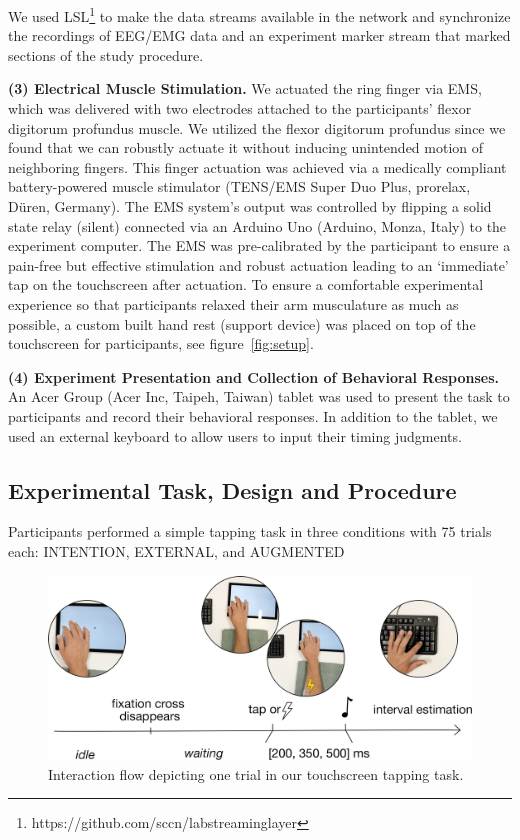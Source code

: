 We used LSL\footnote{https://github.com/sccn/labstreaminglayer} to make the data streams available in the network and synchronize the recordings of EEG/EMG data and an experiment marker stream that marked sections of the study procedure.

\indent\textbf{(3) Electrical Muscle Stimulation.} We actuated the ring finger via EMS, which was delivered with two electrodes attached to the participants' flexor digitorum profundus muscle. We utilized the flexor digitorum profundus since we found that we can robustly actuate it without inducing unintended motion of neighboring fingers. This finger actuation was achieved via a medically compliant battery-powered muscle stimulator (TENS/EMS Super Duo Plus, prorelax, Düren, Germany). The EMS system's output was controlled by flipping a solid state relay (silent) connected via an Arduino Uno (Arduino, Monza, Italy) to the experiment computer. The EMS was pre-calibrated by the participant to ensure a pain-free but effective stimulation and robust actuation leading to an `immediate' tap on the touchscreen after actuation. To ensure a comfortable experimental experience so that participants relaxed their arm musculature as much as possible, a custom built hand rest (support device) was placed on top of the touchscreen for participants, see figure~\ref{fig:setup}.

\indent\textbf{(4) Experiment Presentation and Collection of Behavioral Responses.} An Acer Group (Acer Inc, Taipeh, Taiwan) tablet was used to present the task to participants and record their behavioral responses. In addition to the tablet, we used an external keyboard to allow users to input their timing judgments.

\subsection{Experimental Task, Design and Procedure}
Participants performed a simple tapping task in three conditions with 75 trials each: INTENTION, EXTERNAL, and AUGMENTED

\begin{figure}[h]
    \centering
    \includegraphics[width=\columnwidth]{figures/task_new.pdf}
    \caption{Interaction flow depicting one trial in our touchscreen tapping task.}
    \label{fig:progression}
\end{figure}

